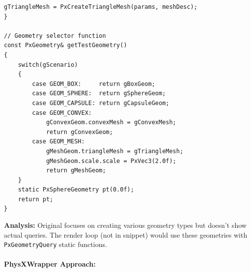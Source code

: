 \begin{lstlisting}[style=cpp, caption=Original Geometry Creation]
    gTriangleMesh = PxCreateTriangleMesh(params, meshDesc);
}

// Geometry selector function
const PxGeometry& getTestGeometry()
{
    switch(gScenario)
    {
        case GEOM_BOX:     return gBoxGeom;
        case GEOM_SPHERE:  return gSphereGeom;
        case GEOM_CAPSULE: return gCapsuleGeom;
        case GEOM_CONVEX:
            gConvexGeom.convexMesh = gConvexMesh;
            return gConvexGeom;
        case GEOM_MESH:
            gMeshGeom.triangleMesh = gTriangleMesh;
            gMeshGeom.scale.scale = PxVec3(2.0f);
            return gMeshGeom;
    }
    static PxSphereGeometry pt(0.0f);
    return pt;
}
\end{lstlisting}

\textbf{Analysis:} Original focuses on creating various geometry types but doesn't show actual queries. The render loop (not in snippet) would use these geometries with \texttt{PxGeometryQuery} static functions.

\paragraph{PhysXWrapper Approach:}

